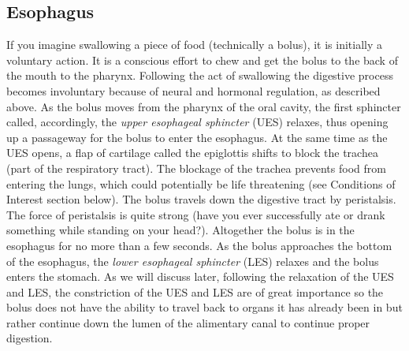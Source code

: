 \documentclass{tufte-handout}
\begin{document}
\subsection{Esophagus}
If you imagine swallowing a piece of food (technically a bolus), it is initially a voluntary action. It is a conscious effort to chew and get the bolus to the back of the mouth to the pharynx. Following the act of swallowing the digestive process becomes involuntary because of neural and hormonal regulation, as described above. As the bolus moves from the pharynx of the oral cavity, the first sphincter called, accordingly, the \emph{upper esophageal sphincter} (UES) relaxes, thus opening up a passageway for the bolus to enter the esophagus. At the same time as the UES opens, a flap of cartilage called the epiglottis shifts to block the trachea (part of the respiratory tract). The blockage of the trachea prevents food from entering the lungs, which could potentially be life threatening (see Conditions of Interest section below). The bolus travels down the digestive tract by peristalsis. The force of peristalsis is quite strong (have you ever successfully ate or drank something while standing on your head?). Altogether the bolus is in the esophagus for no more than a few seconds. As the bolus approaches the bottom of the esophagus, the \emph{lower esophageal sphincter} (LES) relaxes and the bolus enters the stomach. As we will discuss later, following the relaxation of the UES and LES, the constriction of the UES and LES are of great importance so the bolus does not have the ability to travel back to organs it has already been in but rather continue down the lumen of the alimentary canal to continue proper digestion. 
\end{document}
